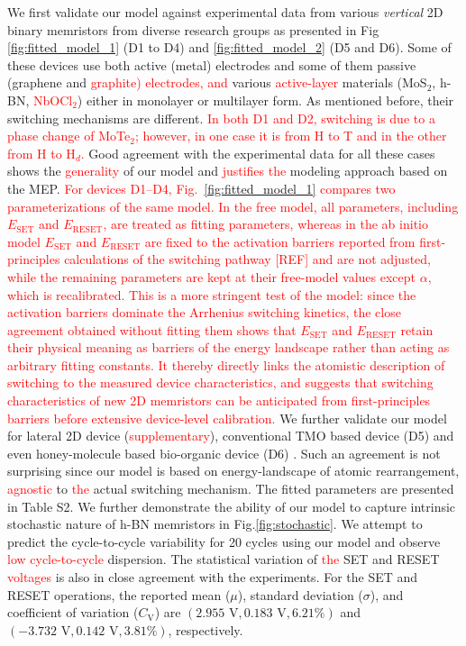 \documentclass[aip,apl,reprint,floatfix]{revtex4-2}
\newcommand{\changed}[1]{\textcolor{red}{#1}}
\begin{document}
We first validate our model against experimental data from various \textit{vertical} 2D binary memristors from diverse research groups \cite{hou2024strain,atomrister,zhang2019electric,Sanchali,deng2022,jnohBN} as presented in Fig \ref{fig:fitted_model_1} (D1 to D4) and \ref{fig:fitted_model_2} (D5 and D6). Some of these devices use both active (metal) electrodes and some of them passive (graphene and \changed{graphite) electrodes, and} various \changed{active-layer} materials (MoS$_{2}$, h-BN, \changed{NbOCl$_{2}$}) either in monolayer or multilayer form.  As mentioned before, their switching mechanisms are different.  \changed{In both D1 and D2, switching is due to a phase change of MoTe$_{2}$; however, in one case it is from H to T and in the other from H to H$_{d}$.} Good agreement with the experimental data for all these cases shows the \changed{generality} of our model and \changed{justifies the} modeling approach based on the MEP. \changed{For devices D1--D4, Fig.~\ref{fig:fitted_model_1} compares two parameterizations of the same model. In the free model, all parameters, including $E_{\text{SET}}$ and $E_{\text{RESET}}$, are treated as fitting parameters, whereas in the ab initio model $E_{\text{SET}}$ and $E_{\text{RESET}}$ are fixed to the activation barriers reported from first-principles calculations of the switching pathway [REF] and are not adjusted, while the remaining parameters are kept at their free-model values except $\alpha$, which is recalibrated. This is a more stringent test of the model: since the activation barriers dominate the Arrhenius switching kinetics, the close agreement obtained without fitting them shows that $E_{\text{SET}}$ and $E_{\text{RESET}}$ retain their physical meaning as barriers of the energy landscape rather than acting as arbitrary fitting constants. It thereby directly links the atomistic description of switching to the measured device characteristics, and suggests that switching characteristics of new 2D memristors can be anticipated from first-principles barriers before extensive device-level calibration.} We further validate our model for lateral 2D device (\textcolor{red}{supplementary}), conventional TMO based device (D5) and even honey-molecule based bio-organic device (D6)  \cite{WSe2,Jiang2016,SUEOKA2022106622}. Such an agreement is not surprising since our model is based on energy-landscape of atomic rearrangement, \changed{agnostic} to \changed{the} actual switching mechanism. The fitted parameters are presented in Table S2. We further demonstrate the ability of our model to capture intrinsic stochastic nature of h-BN memristors \cite{Lee} in Fig.\ref{fig:stochastic}. We attempt to predict the cycle-to-cycle variability \cite{deng2022} for 20 cycles using our model and observe \changed{low cycle-to-cycle} dispersion. The statistical variation of \changed{the} SET and RESET \changed{voltages} is also in close agreement with the experiments. For the SET and RESET operations, the reported mean ($\mu$), standard deviation ($\sigma$), and coefficient of variation ($C_{\text{V}}$) are $(2.955\text{ V}, 0.183\text{ V}, 6.21\%)$ and $(-3.732\text{ V}, 0.142\text{ V}, 3.81\%)$, respectively. 
\end{document}
